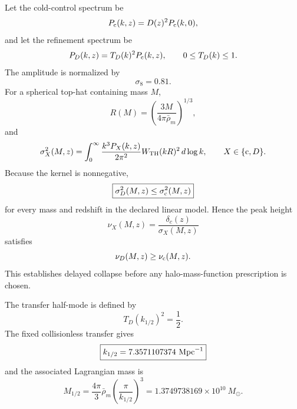 Let the cold-control spectrum be
\begin{equation}
 P_{\rm c}(k,z)=D(z)^2P_{\rm c}(k,0),
 \label{eq:nlh-cold-power}
\end{equation}
and let the refinement spectrum be
\begin{equation}
 P_D(k,z)=T_D(k)^2P_{\rm c}(k,z),
 \qquad
 0\leq T_D(k)\leq1.
 \label{eq:nlh-dark-power}
\end{equation}
The amplitude is normalized by
\begin{equation}
 \sigma_8=0.81.
 \label{eq:nlh-sigma8}
\end{equation}
For a spherical top-hat containing mass $M$,
\begin{equation}
 R(M)=\left(\frac{3M}{4\pi\bar\rho_m}\right)^{1/3},
 \label{eq:nlh-radius}
\end{equation}
and
\begin{equation}
 \sigma_X^2(M,z)
 =\int_0^\infty
 \frac{k^3P_X(k,z)}{2\pi^2}
 W_{\rm TH}(kR)^2\,d\log k,
 \qquad
 X\in\{\mathrm c,D\}.
 \label{eq:nlh-variance}
\end{equation}
Because the kernel is nonnegative,
\begin{equation}
 \boxed{
 \sigma_D^2(M,z)\leq\sigma_{\rm c}^2(M,z)
 }
 \label{eq:nlh-variance-ordering}
\end{equation}
for every mass and redshift in the declared linear model.  Hence the peak height
\begin{equation}
 \nu_X(M,z)=\frac{\delta_c(z)}{\sigma_X(M,z)}
 \label{eq:nlh-peak-height}
\end{equation}
satisfies
\begin{equation}
 \nu_D(M,z)\geq\nu_{\rm c}(M,z).
 \label{eq:nlh-peak-order}
\end{equation}
This establishes delayed collapse before any halo-mass-function prescription is chosen.

The transfer half-mode is defined by
\begin{equation}
 T_D(k_{1/2})^2=\frac12.
 \label{eq:nlh-half-mode}
\end{equation}
The fixed collisionless transfer gives
\begin{equation}
 \boxed{
 k_{1/2}=7.3571107374\ {\rm Mpc}^{-1}
 }
 \label{eq:nlh-half-mode-value}
\end{equation}
and the associated Lagrangian mass is
\begin{equation}
 \boxed{
 M_{1/2}
 =\frac{4\pi}{3}\bar\rho_m
 \left(\frac{\pi}{k_{1/2}}\right)^3
 =1.3749738169\times10^{10}\ M_\odot.
 }
 \label{eq:nlh-half-mode-mass}
\end{equation}

